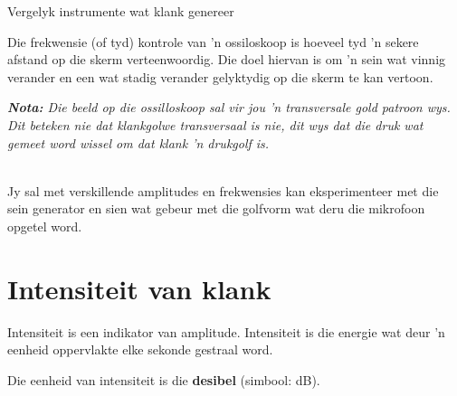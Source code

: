 \begin{activity}{Vergelyk instrumente wat klank genereer}
\begin{minipage}{.5\textwidth}
 	
Die frekwensie (of tyd) kontrole van  'n ossiloskoop is hoeveel tyd  'n sekere afstand op die skerm verteenwoordig. Die doel hiervan is om  'n sein wat vinnig verander en een wat stadig verander gelyktydig op die skerm te kan vertoon.\\
\end{minipage}
\begin{minipage}{.5\textwidth}
\begin{center}
\begin{minipage}{.8\textwidth}
\vspace{.5cm}\textsl{\textbf{Nota:} Die beeld op die ossilloskoop sal vir jou  'n transversale gold patroon wys. Dit beteken nie dat klankgolwe transversaal is nie, dit wys dat die druk wat gemeet word wissel om dat klank  'n drukgolf is.}
\end{minipage}
\end{center}
\end{minipage}
\vspace{1em}\\
Jy sal met verskillende amplitudes en frekwensies kan eksperimenteer met die sein generator en sien wat gebeur met die golfvorm wat deru die mikrofoon opgetel word.\\


\end{activity}



\section*{Intensiteit van klank}
\nopagebreak

\par
Intensiteit is een indikator van amplitude. Intensiteit is die energie wat deur  'n eenheid oppervlakte elke sekonde gestraal word.\par

Die eenheid van intensiteit is die \textbf{desibel} (simbool: dB).

